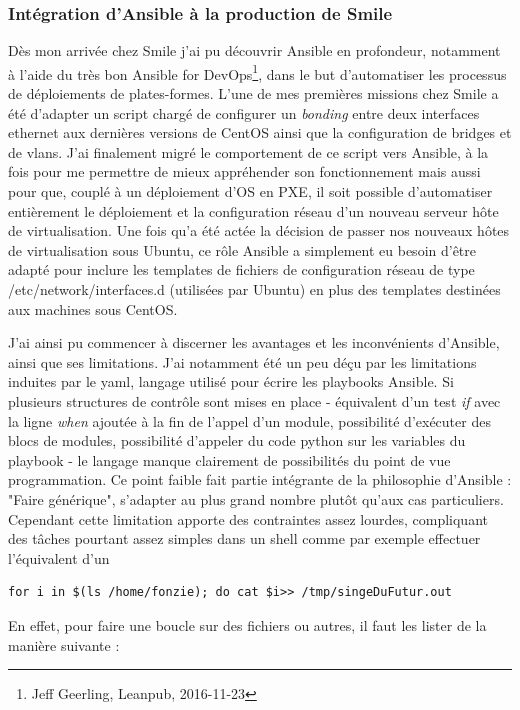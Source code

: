 \documentclass[14 pt]{extreport}
\begin{document}
\subsubsection{Intégration d'Ansible à la production de Smile}

Dès mon arrivée chez Smile j'ai pu découvrir Ansible en profondeur, notamment à l'aide du très bon Ansible for DevOps\footnote{Jeff Geerling, Leanpub, 2016-11-23}, dans le but d'automatiser les processus de déploiements de plates-formes. L'une de mes premières missions chez Smile a été d'adapter un script chargé de configurer un \emph{bonding} entre deux interfaces ethernet aux dernières versions de CentOS ainsi que la configuration de bridges et de vlans. J'ai finalement migré le comportement de ce script vers Ansible, à la fois pour me permettre de mieux appréhender son fonctionnement mais aussi pour que, couplé à un déploiement d'OS en PXE, il soit possible d'automatiser entièrement le déploiement et la configuration réseau d'un nouveau serveur hôte de virtualisation. Une fois qu'a été actée la décision de passer nos nouveaux hôtes de virtualisation sous Ubuntu, ce rôle Ansible a simplement eu besoin d'être adapté pour inclure les templates de fichiers de configuration réseau de type /etc/network/interfaces.d (utilisées par Ubuntu) en plus des templates destinées aux machines sous CentOS.

J'ai ainsi pu commencer à discerner les avantages et les inconvénients d'Ansible, ainsi que ses limitations. J'ai notamment été un peu déçu par les limitations induites par le yaml, langage utilisé pour écrire les playbooks Ansible. Si plusieurs structures de contrôle sont mises en place - équivalent d'un test \emph{if} avec la ligne \emph{when} ajoutée à la fin de l'appel d'un module, possibilité d'exécuter des blocs de modules, possibilité d'appeler du code python sur les variables du playbook - le langage manque clairement de possibilités du point de vue programmation. Ce point faible fait partie intégrante de la philosophie d'Ansible : "Faire générique", s'adapter au plus grand nombre plutôt qu'aux cas particuliers. Cependant cette limitation apporte des contraintes assez lourdes, compliquant des tâches pourtant assez simples dans un shell comme par exemple effectuer l'équivalent d'un \begin{verbatim}for i in $(ls /home/fonzie); do cat $i>> /tmp/singeDuFutur.out \end{verbatim} 

En effet, pour faire une boucle sur des fichiers ou autres, il faut les lister de la manière suivante :
\end{document}
